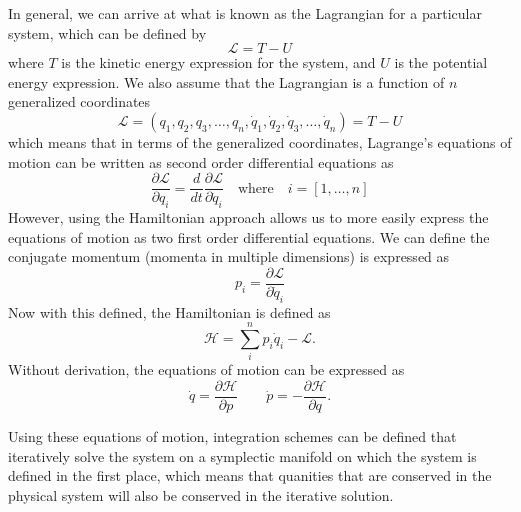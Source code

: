 \documentclass[onecolumn,titlepage,letterpaper,10pt]{article}
\newcommand{\Lagr}{\mathcal{L}}
\newcommand{\ham}{\mathcal{H}}
\newcommand{\paren}[1]{\left(#1\right)}
\newcommand{\partialtop}[2]{\dfrac{\partial#1}{\partial #2}}
\newcommand{\derivative}[2]{\dfrac{d #1}{d #2}}
\begin{document}
In general, we can arrive at what is known as the Lagrangian for a particular
system, which can be defined by
\begin{equation}
    \Lagr = T - U
\end{equation}
where $T$ is the kinetic energy expression for the system, and $U$ is the
potential energy expression. We also assume that the Lagrangian is a function of
$n$ generalized coordinates
\begin{equation}
    \Lagr = \paren{q_1, q_2, q_3, \dots, q_n, \dot{q}_1, \dot{q}_2, \dot{q}_3,
    \dots, \dot{q}_n} = T - U
\end{equation}
which means that in terms of the generalized coordinates, Lagrange's equations
of motion can be written as second order differential equations as
\begin{equation}
    \partialtop{\Lagr}{q_i} = \derivative{}{t}\partialtop{\Lagr}{\dot{q}_i}
    \quad\text{where}\quad
    i = [1,\dots,n]
\end{equation}
However, using the Hamiltonian approach allows us to more easily express the
equations of motion as two first order differential equations. We can define the
conjugate momentum (momenta in multiple dimensions) is expressed as
\begin{equation}
    p_i = \partialtop{\Lagr}{\dot{q}_i}
\end{equation}
Now with this defined, the Hamiltonian is defined as
\begin{equation}
    \ham = \sum_{i}^{n} p_i \dot{q}_i - \Lagr.
\end{equation}
Without derivation, the equations of motion can be expressed as
\begin{equation}
    \dot{q} = \partialtop{\ham}{p}
    \quad\quad
    \dot{p} = -\partialtop{\ham}{q}.
\end{equation}

Using these equations of motion, integration schemes can be defined that
iteratively solve the system on a symplectic manifold on which the system
is defined in the first place, which means that quanities that are conserved in
the physical system will also be conserved in the iterative solution.

\end{document}
